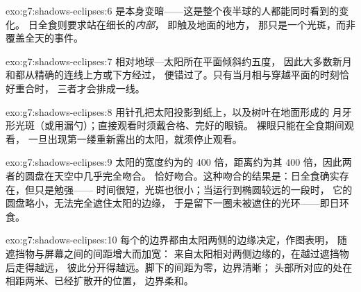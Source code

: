 \begin{solution}{exo:g7:shadows-eclipses:6}
是本身变暗——这是整个夜半球的人都能同时看到的变化。
日全食则要求站在细长的\emph{内部}，
即触及地面的地方，
那只是一个光斑，而非覆盖全天的事件。
\end{solution}

\begin{solution}{exo:g7:shadows-eclipses:7}
相对地球—太阳所在平面倾斜约五度，
因此大多数新月和都从精确的连线上方或下方经过，
便错过了。只有当月相与穿越平面的时刻恰好重合时，
三者才会排成一线。
\end{solution}

\begin{solution}{exo:g7:shadows-eclipses:8}
用针孔把太阳投影到纸上，以及树叶在地面形成的
月牙形光斑（或用漏勺）；直接观看时须戴合格、完好的眼镜。
裸眼只能在全食期间观看，
一旦出现第一缕重新露出的太阳，就须停止观看。
\end{solution}

\begin{solution}{exo:g7:shadows-eclipses:9}
太阳的宽度约为的 $400$ 倍，距离约为其
$400$ 倍，因此两者的圆盘在天空中几乎完全吻合。
恰好吻合。这种吻合的结果是：日全食确实存在，但只是勉强——
时间很短，光斑也很小；当运行到椭圆较远的一段时，
它的圆盘略小，无法完全遮住太阳的边缘，
于是留下一圈未被遮住的光环——即日环食。
\end{solution}

\begin{solution}{exo:g7:shadows-eclipses:10}
每个的边界都由太阳两侧的边缘决定，作图表明，
随遮挡物与屏幕之间的间距增大而加宽：
来自太阳相对两侧边缘的，在越过遮挡物后走得越远，
彼此分开得越远。脚下的间距为零，边界清晰；
头部所对应的处在相距两米、已经扩散开的位置，
边界柔和。
\end{solution}

